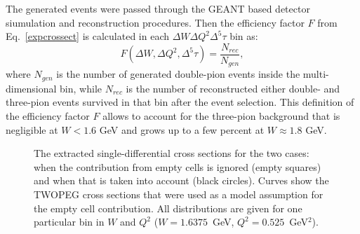 \documentclass[prc,twocolumn,superscriptaddress,showpacs,amssymb,amsmath,amsfonts,linenumbers,aps]{revtex4-1}
\begin{document}
The generated events were passed through the GEANT based detector siumulation and reconstruction procedures. Then the efficiency factor $F$ from Eq.~\eqref{expcrossect} is calculated in each $\Delta W\Delta Q^{2}\Delta^{5} \tau$ bin as:
\begin{equation}
F(\Delta W, \Delta Q^{2}, \Delta^{5} \tau) = \frac{N_{rec}}{N_{gen}},
\label{efficiency}
\end{equation}
where $N_{gen}$ is the number of generated double-pion events inside the multi-dimensional bin, while $N_{rec}$ is the number of reconstructed either double- and three-pion events survived in that bin after the event selection. This definition of the efficiency factor $F$ allows to account for the three-pion background that is negligible at $W < 1.6$ GeV  and
grows up to a few percent at $W \approx 1.8$ GeV. 

\begin{figure}[htp]
\begin{center}
\caption{\small  
The extracted single-differential cross sections  for the two cases: when the contribution from empty cells is ignored (empty squares) and when that is taken into account (black circles).
Curves show the TWOPEG cross sections that were used as a model assumption for the empty cell contribution. All distributions are given for one particular bin in $W$ and $Q^2$ ($W = 1.6375$~GeV, $Q^2 = 0.525$~GeV$^2$).} \label{fig:topologies}
\end{center}
\end{figure}

\end{document}
